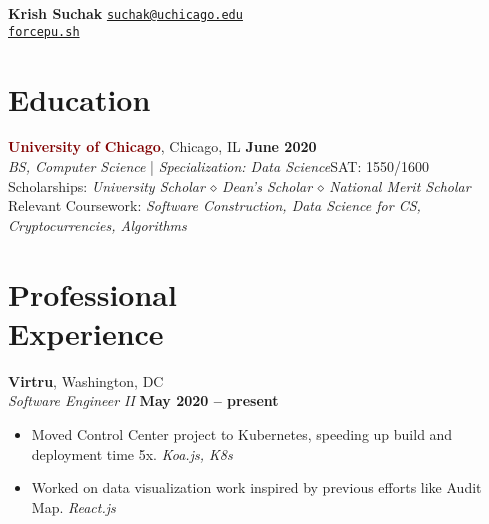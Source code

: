 \documentclass[margin]{resume}
\begin{document}
\hspace{-28mm}\textbf {\Large Krish Suchak}
\hfill \textcolor{blu}{\texttt{\href{mailto:suchak@uchicago.edu}{suchak@uchicago.edu}}}
\\ \phantom{invisible} \hfill \hspace{5mm} \texttt{\href{https://forcepu.sh}{force}}\textcolor{blu}{\texttt{\href{https://forcepu.sh}{pu.sh}}}
\vspace{4mm}

    \section{\mysidestyle Education}

    \textcolor{maroon}{\textbf{University of Chicago}}, Chicago, IL \hfill \textbf{June 2020} \vspace{2mm}\\\vspace{1mm}%
    \textsl{BS, Computer Science} | \textsl{Specialization: Data Science}\hfill SAT: 1550/1600\\
Scholarships: \textit{University Scholar $\smwhtdiamond$ Dean’s Scholar $\smwhtdiamond$ National Merit Scholar}\\
Relevant Coursework: \textit{Software Construction, Data Science for CS, Cryptocurrencies, Algorithms}

    \section{\mysidestyle Professional\\Experience}

    
    \textcolor{blu}{\textbf{Virtru}}, Washington, DC \vspace{2mm}\\\vspace{1mm}%
   \textsl{Software Engineer II} \hfill \textbf{May 2020 -- present}

\begin{itemize}
\item Moved Control Center project to Kubernetes, speeding up build and deployment time 5x. \phantom{invisible} \hfill \textit{Koa.js, K8s}
\item Worked on data visualization work inspired by previous efforts like Audit Map. \hfill \textit{React.js}
\end{itemize}    
\end{document}
